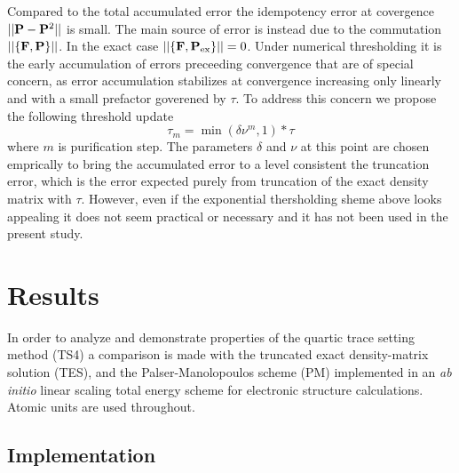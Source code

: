 \commentoutA{\documentclass[prb,aps,twocolumn,twocolumngrid,secnumarabic,superbib,hyperref]{revtex4}}
\begin{document}
Compared to the total accumulated error the idempotency error
at covergence $||{\bf P} - {\bf P}^2||$ is small. The main source of 
error is instead due to the commutation $||\{ {\bf F},{\bf P} \} || $. 
In the exact case $|| \{ {\bf F},{\bf P}_{\rm ex} \} || =0$.
Under numerical thresholding it is the early accumulation of errors preceeding 
convergence that are of special concern, as error accumulation stabilizes at convergence 
increasing only linearly and with a small prefactor goverened by $\tau$.  To address 
this concern we propose the following threshold update
\begin{equation}
\tau_m = \min ( \delta \nu^m,1)*\tau
\end{equation}
where $m$ is purification step.  The parameters $\delta$ and $\nu$ at this point are chosen 
emprically to bring the accumulated error to a level consistent the truncation error, which 
is the error expected purely from truncation of the exact density matrix with $\tau$.
However, even if the exponential thersholding sheme above looks appealing it does not
seem practical or necessary and it has not been used in the present study.


\section{Results}

In order to analyze and demonstrate properties of the quartic trace setting method (TS4)
a comparison is made with the truncated exact density-matrix solution (TES), and the 
Palser-Manolopoulos scheme (PM) \cite{Palser98} implemented in an {\it ab initio}
linear scaling total energy scheme for electronic structure calculations.
Atomic units are used throughout. 

\subsection{Implementation}
\end{document}
